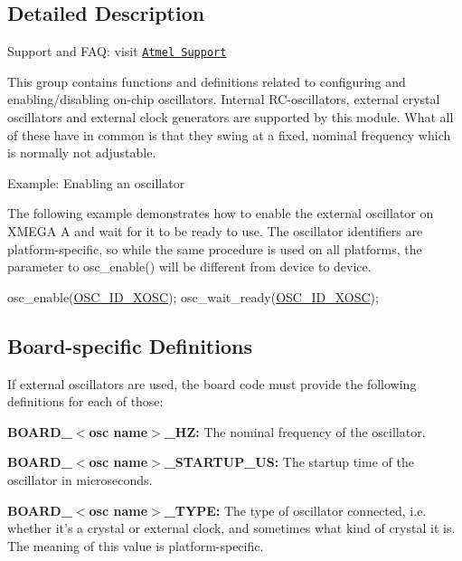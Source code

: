 \subsection{Detailed Description}
Support and F\-A\-Q\-: visit \href{http://www.atmel.com/design-support/}{\tt Atmel Support}

This group contains functions and definitions related to configuring and enabling/disabling on-\/chip oscillators. Internal R\-C-\/oscillators, external crystal oscillators and external clock generators are supported by this module. What all of these have in common is that they swing at a fixed, nominal frequency which is normally not adjustable.

\begin{DoxyParagraph}{Example\-: Enabling an oscillator}

\end{DoxyParagraph}
The following example demonstrates how to enable the external oscillator on X\-M\-E\-G\-A A and wait for it to be ready to use. The oscillator identifiers are platform-\/specific, so while the same procedure is used on all platforms, the parameter to osc\-\_\-enable() will be different from device to device. 
\begin{DoxyCode}
        osc\_enable(\hyperlink{group__osc__group_ga06beba0d3cb4adcbf2f8a6f8cf5d72ff}{OSC\_ID\_XOSC});
        osc\_wait\_ready(\hyperlink{group__osc__group_ga06beba0d3cb4adcbf2f8a6f8cf5d72ff}{OSC\_ID\_XOSC}); 
\end{DoxyCode}
\hypertarget{group__osc__group_osc_group_board}{}\subsection{Board-\/specific Definitions}\label{group__osc__group_osc_group_board}
If external oscillators are used, the board code must provide the following definitions for each of those\-:
\begin{DoxyItemize}
\item {\bfseries B\-O\-A\-R\-D\-\_\-$<$osc name$>$\-\_\-\-H\-Z\-:} The nominal frequency of the oscillator.
\item {\bfseries B\-O\-A\-R\-D\-\_\-$<$osc name$>$\-\_\-\-S\-T\-A\-R\-T\-U\-P\-\_\-\-U\-S\-:} The startup time of the oscillator in microseconds.
\item {\bfseries B\-O\-A\-R\-D\-\_\-$<$osc name$>$\-\_\-\-T\-Y\-P\-E\-:} The type of oscillator connected, i.\-e. whether it's a crystal or external clock, and sometimes what kind of crystal it is. The meaning of this value is platform-\/specific.
\end{DoxyItemize}

